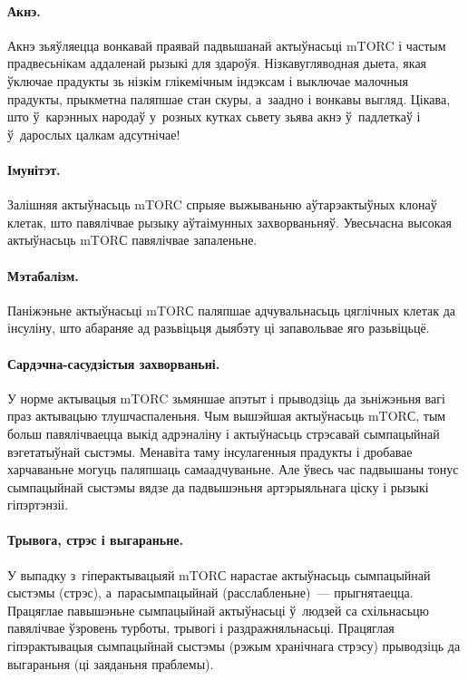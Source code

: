 \paragraph{Акнэ.}
Акнэ зьяўляецца вонкавай праявай падвышанай актыўнасьці mTORC і частым прадвесьнікам аддаленай рызыкі для здароўя. Нізкавугляводная дыета, якая ўключае прадукты зь нізкім глікемічным індэксам і выключае малочныя прадукты, прыкметна паляпшае стан скуры, а~заадно і вонкавы выгляд. Цікава, што ў~карэнных народаў у~розных кутках сьвету зьява акнэ ў~падлеткаў і ў~дарослых цалкам адсутнічае!

\paragraph{Імунітэт.}
Залішняя актыўнасьць mTORC спрыяе выжываньню аўтарэактыўных клонаў клетак, што павялічвае рызыку аўтаімунных захворваньняў. Увесьчасна высокая актыўнасьць mTORС павялічвае запаленьне.

\paragraph{Мэтабалізм.}
Паніжэньне актыўнасьці mTORС паляпшае адчувальнасьць цяглічных клетак да інсуліну, што абараняе ад разьвіцьця дыябэту ці запавольвае яго разьвіцьцё.


\paragraph{Сардэчна-сасудзістыя захворваньні.}
У норме актывацыя mTORC зьмяншае апэтыт і прыводзіць да зьніжэньня вагі праз актывацыю тлушчаспаленьня. Чым вышэйшая актыўнасьць mTORС, тым больш павялічваецца выкід адрэналіну і актыўнасьць стрэсавай сымпацыйнай вэгетатыўнай сыстэмы. Менавіта таму інсулагенныя прадукты і дробавае харчаваньне могуць паляпшаць самаадчуваньне. Але ўвесь час падвышаны тонус сымпацыйнай сыстэмы вядзе да падвышэньня артэрыяльнага ціску і рызыкі гіпэртэнзіі.

\paragraph{Трывога, стрэс і выгараньне.}
У выпадку з~гіперактывацыяй mTORС нарастае актыўнасьць сымпацыйнай сыстэмы (стрэс), а~парасымпацыйнай (расслабленьне)~--- прыгнятаецца. Працяглае павышэньне сымпацыйнай актыўнасьці ў~людзей са схільнасьцю павялічвае ўзровень турботы, трывогі і раздражняльнасьці. Працяглая гіпэрактывацыя сымпацыйнай сыстэмы (рэжым хранічнага стрэсу) прыводзіць да выгараньня (ці заяданьня праблемы).

